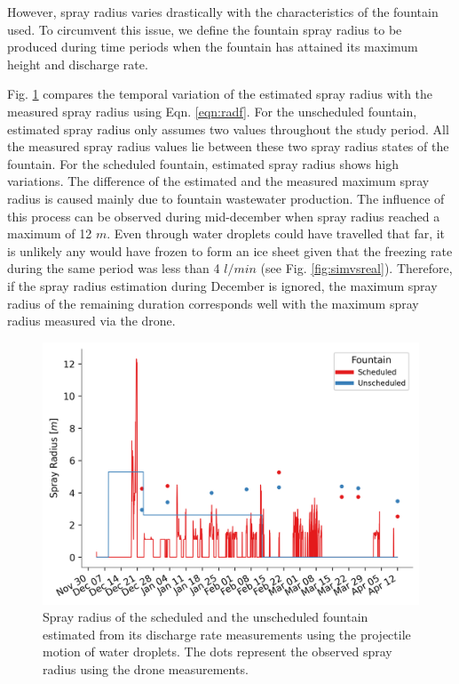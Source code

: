 \documentclass[tc, manuscript]{copernicus}
\begin{document}
However, spray radius varies drastically with the characteristics of the fountain used. To circumvent this
issue, we define the fountain spray radius to be produced during time periods when the fountain has attained its
maximum height and discharge rate. 

Fig. \ref{fig:radf} compares the temporal variation of the estimated spray radius with the measured spray radius
using Eqn. \ref{eqn:radf}. For the unscheduled fountain, estimated spray radius only assumes two values
throughout the study period. All the measured spray radius values lie between these two spray radius states of
the fountain. For the scheduled fountain, estimated spray radius shows high variations. The difference of the
estimated and the measured maximum spray radius is caused mainly due to fountain wastewater production. The
influence of this process can be observed during mid-december when spray radius reached a maximum of 12 $m$.
Even through water droplets could have travelled that far, it is unlikely any would have frozen to form an ice
sheet given that the freezing rate during the same period was less than 4 $l/min$ (see Fig.
\ref{fig:simvsreal}). Therefore, if the spray radius estimation during December is ignored, the maximum spray
radius of the remaining duration corresponds well with the maximum spray radius measured via the drone.

\begin{figure}[t]
\includegraphics[width=12cm]{Figures/radf.png}

\caption{Spray radius of the scheduled and the unscheduled fountain estimated from its discharge rate measurements using the
projectile motion of water droplets. The dots represent the observed spray radius using the drone measurements.
}

\label{fig:radf}
\end{figure}
\end{document}
